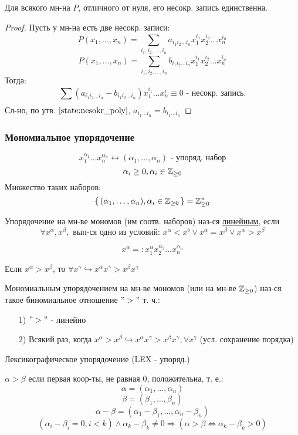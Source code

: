 \begin{statement}
Для всякого мн-на $P$, отличного от нуля, его несокр. запись единственна.
\end{statement}
\begin{proof}
Пусть у мн-на есть две несокр. записи:
\[
P(x_1, \ldots, x_n) =\sum_{i_1, i_2, \ldots, i_n}^{} a_{i_1i_2\ldots i_n} x_1^{i_1} x_2^{i_2}\ldots x_n^{i_n}
\]
\[
  P(x_1, \ldots, x_n) =\sum_{i_1, i_2, \ldots, i_n}^{} b_{i_1i_2\ldots i_n} x_1^{i_1} x_2^{i_2}\ldots x_n^{i_n}
\]
Тогда:
\[
\sum_{}^{}(a_{i_1i_2\ldots i_n} - b_{i_1i_2\ldots i_n})x_1^{i_1}\ldots x_n^{i} \equiv 0\text{ - несокр. запись.}
\]
Сл-но, по утв. $\ref{state:nesokr_poly}$, $a_{i_1\ldots i_n} = b_{i_1\ldots i_n}$
\end{proof}
\subsubsection{Мономиальное упорядочение}
\[
x_1^{\alpha_1}\ldots x_n^{\alpha_n} \leftrightarrow (\alpha_1, \ldots, \alpha_n) \text{ - упоряд. набор}
\]
\[
  \alpha_i \geq 0, \alpha_i \in \mathbb{Z}_{\geq 0}
\]
Множество таких наборов: 
\[
\set{(\alpha_1, \ldots, \alpha_n), \alpha_i \in \mathbb{Z}_{\geq 0}} = \mathbb{Z}_{\geq 0}^{n}
\]
\begin{definition}
Упорядочение на мн-ве мономов (им соотв. наборов) наз-ся \underline{линейным}, если 
\[
\forall x^{\alpha}, x^{\beta}, \text{ вып-ся одно из условий: } x^{\alpha} < x^{b} \lor x^{\alpha} = x^{\beta} \lor x^{\alpha} > x^{\beta}
\]
\begin{symb}
\[
  x^{\alpha} =\colon x_1^{\alpha}x_2^{\alpha_2} \ldots x_n^{\alpha_n}
\]
\end{symb}
Если $x^{\alpha} > x^{\beta}$, то $\forall x^{\gamma} \hookrightarrow x^{\alpha}x^{\gamma} > x^{\beta}x^{\gamma}$
\end{definition}
\begin{definition}
Мономиальным упорядочением на мн-ве мономов (или на мн-ве $\mathbb{Z}_{\geq 0}$) наз-ся такое биномиальное отношение $">"$ т. ч.:
\begin{itemize}
  \item [1) ] $">"$ - линейно
  \item [2) ] Всякий раз, когда $x^{\alpha} > x^{\beta} \hookrightarrow x^{\alpha}x^{\gamma} > x^{\beta}x^{\gamma}, \forall x^{\gamma}$ (усл. сохранение порядка)
\end{itemize}
\end{definition}
\begin{example}
Лексикографическое упорядочение (LEX - упоряд.)
\begin{definition}
$\alpha > \beta$ если первая коор-ты, не равная 0, положительна, т. е.:
\[
\alpha = (\alpha_1, \ldots, \alpha_n)
\]
\[
\beta = (\beta_1, \ldots, \beta_n)
\]
\[
\alpha - \beta = (\alpha_1 - \beta_1, \ldots, \alpha_n - \beta_n)
\]
\[
  (\alpha_i - \beta_i = 0, i < k) \land \alpha_k - \beta_k \neq 0 \Rightarrow (\alpha > \beta \iff \alpha_k - \beta_k > 0)
\]
\end{definition}
\end{example}
